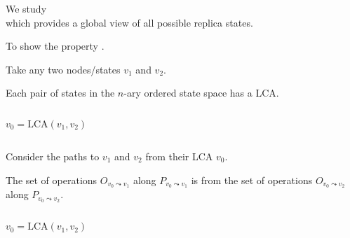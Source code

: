 
\begin{frame}{}
  \centerline{}
\end{frame}

\begin{frame}{}
  \begin{center}
    {\large We study  \\ which provides a global view of all possible replica states.}
  \end{center}


  \pause
  \begin{center}
    {\large To show the  property .}
  \end{center}
\end{frame}

\begin{frame}{}
  \centerline{ Take any two nodes/states $v_1$ and $v_2$.}

  \begin{lemma}
    Each pair of states in the $n$-ary ordered state space has a  LCA.
  \end{lemma}

  \begin{columns}
	\[
	  v_0 = \text{LCA}(v_1, v_2)
	\]
  \end{columns}

\end{frame}

\begin{frame}{}
  \centerline{ Consider the paths to $v_1$ and $v_2$ from their LCA $v_0$.}

  \begin{lemma}
    The set of operations $O_{v_0 \leadsto v_1}$ along $P_{v_0 \leadsto v_1}$ 
    is  from the set of operations $O_{v_0 \leadsto v_2}$ along $P_{v_0 \leadsto v_2}$.
  \end{lemma}

  \begin{columns}
	\[
	  v_0 = \text{LCA}(v_1, v_2)
	\]
  \end{columns}
\end{frame}

